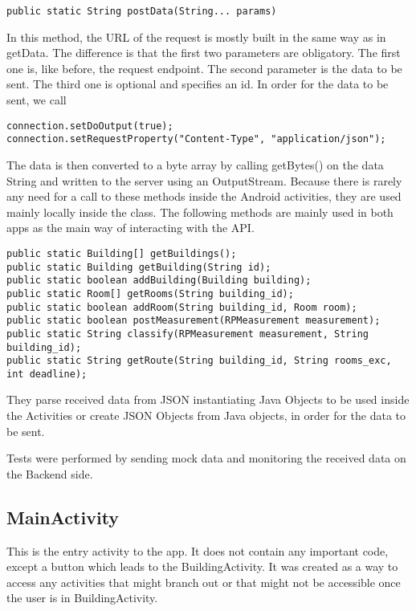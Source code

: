 \begin{lstlisting}
public static String postData(String... params)
\end{lstlisting}
In this method, the URL of the request is mostly built in the same way as in getData. The difference is that the first two parameters are obligatory. The first one is, like before, the request endpoint. The second parameter is the data to be sent. The third one is optional and specifies an id. 
In order for the data to be sent, we call
\begin{lstlisting}
connection.setDoOutput(true);
connection.setRequestProperty("Content-Type", "application/json");
\end{lstlisting}
The data is then converted to a byte array by calling getBytes() on the data String and written to the server using an OutputStream.
Because there is rarely any need for a call to these methods inside the Android activities, they are used mainly locally inside the class. The following methods are mainly used in both apps as the main way of interacting with the API.
\begin{lstlisting}
public static Building[] getBuildings();
public static Building getBuilding(String id);
public static boolean addBuilding(Building building);
public static Room[] getRooms(String building_id);
public static boolean addRoom(String building_id, Room room);
public static boolean postMeasurement(RPMeasurement measurement);
public static String classify(RPMeasurement measurement, String building_id);
public static String getRoute(String building_id, String rooms_exc, int deadline);
\end{lstlisting}
They parse received data from JSON instantiating Java Objects to be used inside the Activities or create JSON Objects from Java objects, in order for the data to be sent.

Tests were performed by sending mock data and monitoring the received data on the Backend side.
\subsection{MainActivity}
This is the entry activity to the app. It does not contain any important code, except a button which leads to the BuildingActivity. It was created as a way to access any activities that might branch out or that might not be accessible once the user is in BuildingActivity.

